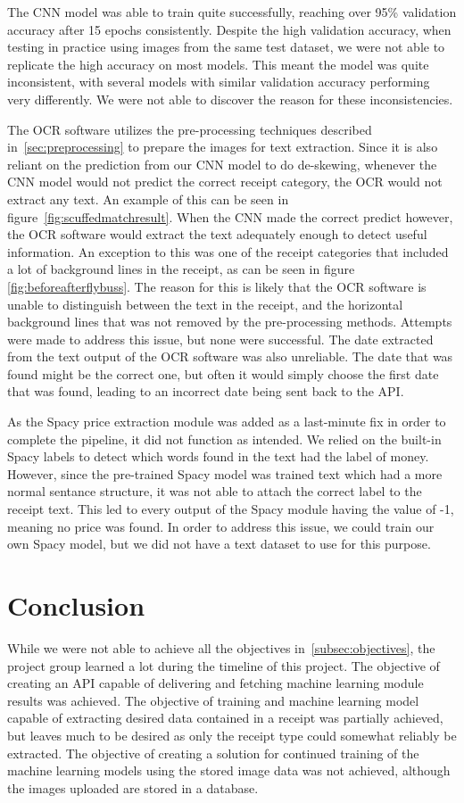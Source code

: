 The CNN model was able to train quite successfully, reaching over 95\% validation accuracy after 15 epochs consistently.
Despite the high validation accuracy, when testing in practice using images from the same test dataset, we were not able to replicate the high accuracy on most models.
This meant the model was quite inconsistent, with several models with similar validation accuracy performing very differently.
We were not able to discover the reason for these inconsistencies.

The OCR software utilizes the pre-processing techniques described in~\ref{sec:preprocessing} to prepare the images
for text extraction.
Since it is also reliant on the prediction from our CNN model to do de-skewing, whenever the CNN model would not predict the correct receipt category, the OCR would not extract any text.
An example of this can be seen in figure~\ref{fig:scuffedmatchresult}.
When the CNN made the correct predict however, the OCR software would extract the text adequately enough to detect useful information.
An exception to this was one of the receipt categories that included a lot of background lines in the receipt, as can be seen in figure \ref{fig:beforeafterflybuss}.
The reason for this is likely that the OCR software is unable to distinguish between the text in the receipt, and the horizontal background lines that was not removed by the pre-processing methods.
Attempts were made to address this issue, but none were successful.
The date extracted from the text output of the OCR software was also unreliable.
The date that was found might be the correct one, but often it would simply choose the first date that was found, leading to an incorrect date being sent back to the API.

As the Spacy price extraction module was added as a last-minute fix in order to complete the pipeline, it did not function as intended.
We relied on the built-in Spacy labels to detect which words found in the text had the label of money.
However, since the pre-trained Spacy model was trained text which had a more normal sentance structure, it was not able to attach the correct label to the receipt text.
This led to every output of the Spacy module having the value of -1, meaning no price was found.
In order to address this issue, we could train our own Spacy model, but we did not have a text dataset to use for this purpose.

\section{Conclusion}\label{sec:conclusion}
While we were not able to achieve all the objectives in~\ref{subsec:objectives}, the project group learned a lot during
the timeline of this project.
The objective of creating an API capable of delivering and fetching machine learning module results was achieved.
The objective of training and machine learning model capable of extracting desired data contained in a receipt was partially achieved, but leaves much to be desired as only the receipt type could somewhat reliably be extracted.
The objective of creating a solution for continued training of the machine learning models using the stored image data was not achieved, although the images uploaded are stored in a database.

